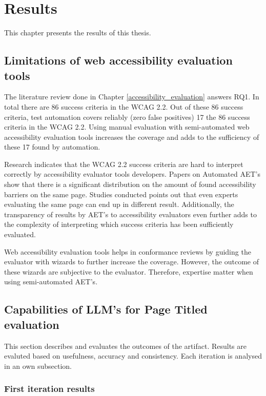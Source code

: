 \chapter{Results\label{results}}

This chapter presents the results of this thesis. 

\section{Limitations of web accessibility evaluation tools}

The literature review done in Chapter \ref{accessibility_evaluation} answers RQ1. In total there are 86 success criteria in the WCAG 2.2. Out of these 86 success criteria, test automation covers reliably (zero false positives) 17 the 86 success criteria in the WCAG 2.2. Using manual evaluation with semi-automated web accessibility evaluation tools increases the coverage and adds to the sufficiency of these 17 found by automation.

Research indicates that the WCAG 2.2 success criteria are hard to interpret correctly by accessibility evaluator tools developers. Papers on Automated AET's show that there is a significant distribution on the amount of found accessibility barriers on the same page. Studies conducted points out that even experts evaluating the same page can end up in different result. Additionally, the transparency of results by AET's to accessibility evaluators even further adds to the complexity of interpreting which success criteria has been sufficiently evaluated.

Web accessibility evaluation tools helps in conformance reviews by guiding the evaluator with wizards to further increase the coverage. However, the outcome of these wizards are subjective to the evaluator. Therefore, expertise matter when using semi-automated AET's.

\section{Capabilities of LLM's for Page Titled evaluation}

This section describes and evaluates the outcomes of the artifact. Results are evaluted based on usefulness, accuracy and consistency. Each iteration is analysed in an own subsection.

\subsection{First iteration results}

